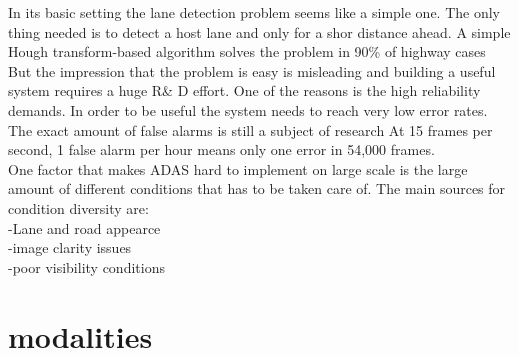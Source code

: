 In its basic setting the lane detection problem seems like a simple one. The only thing needed is to detect a host lane and only for a shor distance ahead. A simple Hough transform-based algorithm solves the problem in 90\% of highway cases %
But the impression that the problem is easy is misleading and building a useful system requires a huge R\& D effort. One of the reasons is the high reliability demands. In order to be useful the system needs to reach very low error rates. The exact amount of false alarms is still a subject of research %
At 15 frames per second, 1 false alarm per hour means only one error in 54,000 frames. \\


One factor that makes ADAS hard to implement on large scale is the large amount of different conditions that has to be taken care of. The main sources for condition diversity are:\\
-Lane and road appearce\\
-image clarity issues\\
-poor visibility conditions\\

\section{modalities}

